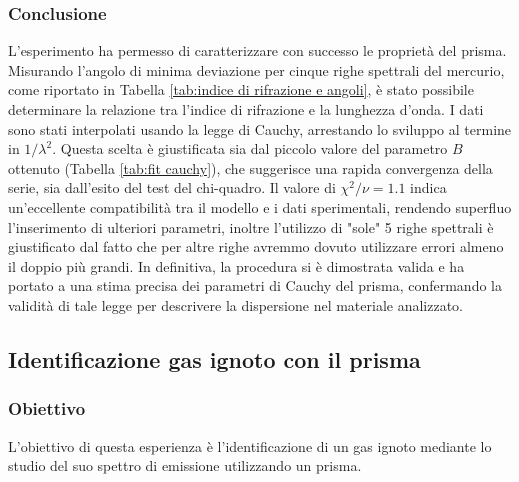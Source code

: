 \documentclass[a4paper]{article}
\begin{document}
\subsubsection{Conclusione}
L'esperimento ha permesso di caratterizzare con successo le proprietà del prisma. Misurando l'angolo di minima deviazione per cinque righe spettrali del mercurio, come riportato in Tabella \ref{tab:indice di rifrazione e angoli}, è stato possibile determinare la relazione tra l'indice di rifrazione e la lunghezza d'onda.
I dati sono stati interpolati usando la legge di Cauchy, arrestando lo sviluppo al termine in $1/\lambda^2$. Questa scelta è giustificata sia dal piccolo valore del parametro $B$ ottenuto (Tabella \ref{tab:fit cauchy}), che suggerisce una rapida convergenza della serie, sia dall'esito del test del chi-quadro. Il valore di $\chi^2/\nu = 1.1$ indica un'eccellente compatibilità tra il modello e i dati sperimentali, rendendo superfluo l'inserimento di ulteriori parametri, inoltre l'utilizzo di "sole" 5 righe spettrali è giustificato dal fatto che per altre righe avremmo dovuto utilizzare errori almeno il doppio più grandi.
In definitiva, la procedura si è dimostrata valida e ha portato a una stima precisa dei parametri di Cauchy del prisma, confermando la validità di tale legge per descrivere la dispersione nel materiale analizzato.

\subsection{Identificazione gas ignoto con il prisma}
\subsubsection{Obiettivo}
L'obiettivo di questa esperienza è l'identificazione di un gas ignoto mediante lo studio del suo spettro di emissione utilizzando un prisma.
\end{document}
